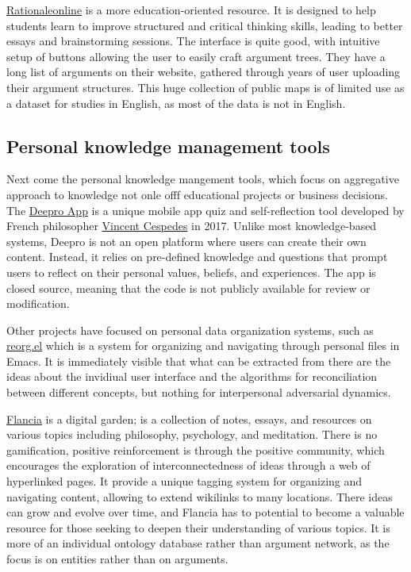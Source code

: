 \documentclass{article}
\begin{document}
\href{https://www.rationaleonline.com/browse/all}{Rationaleonline} is a more education-oriented resource. It is designed to help students learn to improve structured and critical thinking skills, leading to better essays and brainstorming sessions.
The interface is quite good, with intuitive setup of buttons allowing the user to easily craft argument trees.
They have a long list of arguments on their website, gathered through years of user uploading their argument structures.
This huge collection of public maps is of limited use as a dataset for studies in English, as most of the data is not in English.

\subsection{Personal knowledge management tools}
Next come the personal knowledge mangement tools, which focus on aggregative approach to knowledge not onle offf educational projects or business decisions.
The \href{https://play.google.com/store/apps/details?id=fr.deepro.app&hl=en_US}{Deepro App} is a unique mobile app quiz and self-reflection tool developed by French philosopher \href{https://en.wikipedia.org/wiki/Vincent_Cespedes}{Vincent Cespedes} in 2017. Unlike most knowledge-based systems, Deepro is not an open platform where users can create their own content. Instead, it relies on pre-defined knowledge and questions that prompt users to reflect on their personal values, beliefs, and experiences. The app is closed source, meaning that the code is not publicly available for review or modification.

Other projects have focused on personal data organization systems, such as \href{https://github.com/senters/reorg.el}{reorg.el} which is a system for organizing and navigating through personal files in Emacs. It is immediately visible that what can be extracted from there are the ideas about the invidiual user interface and the algorithms for reconciliation between different concepts, but nothing for interpersonal adversarial dynamics.

\href{https://flancia.org/}{Flancia} is a digital garden; is a collection of notes, essays, and resources on various topics including philosophy, psychology, and meditation. There is no gamification, positive reinforcement is through the positive community, which encourages the exploration of interconnectedness of ideas through a web of hyperlinked pages. It provide a unique tagging system for organizing and navigating content, allowing to extend wikilinks to many locations. There ideas can grow and evolve over time, and Flancia has to potential to become a valuable resource for those seeking to deepen their understanding of various topics. It is more of an individual ontology database rather than argument network, as the focus is on entities rather than on arguments.
\end{document}

